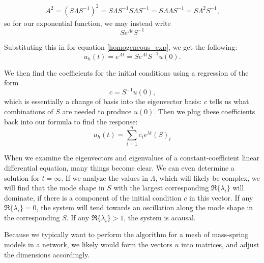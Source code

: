 \documentclass[a4paper,10pt]{report}
\numberwithin{equation}{section}
\begin{document}
\begin{align*}
A^2 = (S \Lambda S^{-1})^2
= S \Lambda S^{-1} S \Lambda S^{-1}
= S \Lambda \Lambda S^{-1}
= S \Lambda^2 S^{-1} \text{,}
\end{align*}
so for our exponential function, we may instead write
\begin{equation}
S e^{\Lambda t} S^{-1}
\end{equation}

Substituting this in for equation \eqref{homogeneous_exp}, we get the following:
\begin{equation}
u_h(t) = e^{At} = Se^{\Lambda t} S^{-1} u(0) \text{.}
\end{equation}

We then find the coefficients for the initial conditions using a regression of the form
\begin{equation}\label{coef_regression}
 c = S^{-1} u(0) \text{,} 
\end{equation}
which is essentially a change of basis into the eigenvector basis: $c$ tells us what combinations of $S$ are needed to produce $u(0)$. Then we plug these coefficients back into our formula to find the response:
\begin{equation}
 u_h(t) = \sum_{i=1}^n c_i e^{\lambda t} (S)_i
\end{equation}

When we examine the eigenvectors and eigenvalues of a constant-coefficient linear differential equation, many things become clear. We can even determine a solution for $t = \infty$. If we analyze the values in $\Lambda$, which will likely be complex, we will find that the mode shape in $S$ with the largest corresponding $\Re\{\lambda_i\}$ will dominate, if there is a component of the initial condition $c$ in this vector. If any $\Re\{\lambda_i\} = 0$, the system will tend towards an oscillation along the mode shape in the corresponding $S$. If any $\Re\{\lambda_i\} > 1$, the system is acausal. \cite[p.~318]{Strang2009}

Because we typically want to perform the algorithm for a mesh of mass-spring models in a network, we likely would form the vectors $u$ into matrices, and adjust the dimensions accordingly.\cite[p.~20]{Reid1992}
\end{document}
